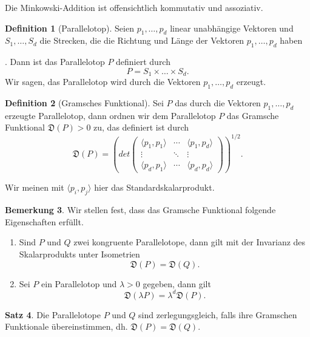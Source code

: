 \documentclass[11pt,titlepage]{article}
\theoremstyle{definition}
\newtheorem{theorem}{Satz}[section]
\newtheorem{definition}[theorem]{Definition}
\newtheorem{remark}[theorem]{Bemerkung}
\theoremstyle{remark}
\begin{document}
	Die Minkowski-Addition ist offensichtlich kommutativ und assoziativ. 
	
	\begin{definition}[Parallelotop]
		Seien $p_1,\ldots,p_d$ linear unabhängige Vektoren und $S_1,\ldots,S_d$ 
		die Strecken, die die Richtung und Länge der Vektoren $p_1,\ldots,p_d$ 
		haben
		
		
		. Dann ist das Parallelotop $P$ definiert durch 
		\[P=S_1\times\ldots\times S_d.\]
		Wir sagen, das Parallelotop wird durch die Vektoren $p_1,\ldots,p_d$ 
		erzeugt.
	\end{definition}
	
	\begin{definition}[Gramsches Funktional]
		Sei $P$ das durch die Vektoren $p_1,\ldots,p_d$ 
		erzeugte Parallelotop, dann ordnen wir dem Parallelotop $P$ das 
		Gramsche Funktional $\mathfrak{D}(P)>0$ zu, das definiert ist durch
		\[\mathfrak{D}(P)=\left(det \begin{pmatrix}
		\langle p_1,p_1\rangle & \cdots &\langle p_1,p_d\rangle \\
		\vdots & \ddots & \vdots \\
		\langle p_d,p_1 \rangle & \cdots & \langle p_d,p_d \rangle
		\end{pmatrix}\right)^{1/2}.\]
	\end{definition}
	
	Wir meinen mit $\langle p_i,p_j\rangle$ hier das Standardskalarprodukt. 
	
	\begin{remark}
		Wir stellen fest, dass das Gramsche Funktional folgende Eigenschaften 
		erfüllt.
		\begin{enumerate}
			\item Sind $P$ und $Q$ zwei kongruente Parallelotope, dann gilt mit 
			der Invarianz des Skalarprodukts unter Isometrien
			\[\mathfrak{D}(P)=\mathfrak{D}(Q).\]
			\item Sei $P$ ein Parallelotop und $\lambda>0$ gegeben, dann gilt 
			\[\mathfrak{D}(\lambda P)=\lambda^d \mathfrak{D}(P).\]
		\end{enumerate}
	\end{remark}
	
	\begin{theorem} \label{thm:zerlgram}
		Die Parallelotope $P$ und $Q$ sind zerlegungsgleich, falls ihre 
		Gramschen Funktionale übereinstimmen, dh. $\mathfrak{D}(P)=\mathfrak{D}(Q)$.
	\end{theorem}
	
\end{document}

